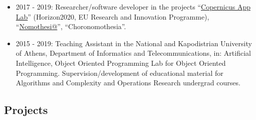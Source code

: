 \documentclass[a4paper,oneside,11pt]{article}
\begin{document}
\begin{itemize}

	\item 2017 - 2019: Researcher/software developer in the projects ``\href{https://cordis.europa.eu/project/id/730124}{Copernicus App Lab}'' (Horizon2020, EU Research and Innovation Programme), ``\href{http://legislation.di.uoa.gr}{Nomothesi@}'', ``Choronomothesia''. 

	\item 2015 - 2019: Teaching Assistant in the National and Kapodistrian University of Athens, Department of Informatics and Telecommunications, in: Artificial Intelligence, Object Oriented Programming Lab for Object Oriented Programming. Supervision/development of educational material for Algorithms and Complexity and Operations Research undergrad courses.

\end{itemize}

\subsection*{Projects}
\end{document}
